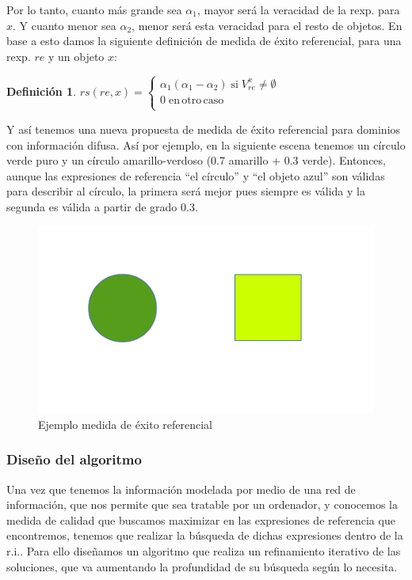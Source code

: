 \documentclass[10pt,a4paper]{article}
\newtheorem{definicion}{Definición}
\begin{document}
Por lo tanto, cuanto más grande sea $\alpha_1$, mayor será la veracidad de la rexp. para $x$. Y cuanto menor sea $\alpha_2$, menor será esta veracidad para el resto de objetos. En base a esto damos la siguiente definición de medida de éxito referencial, para una rexp. $re$ y un objeto $x$:

\begin{definicion}
\label{def: medida}
$rs(re, x) = \left\lbrace 
\begin{array}{ll}
      \alpha_1(\alpha_1 - \alpha_2) \; \mathrm{si} \; V_{re}^x \neq \emptyset\\      
      0 \; \mathrm{en \, otro \, caso}\\
\end{array} \right.$
\end{definicion}

Y así tenemos una nueva propuesta de medida de éxito referencial para dominios con información difusa. Así por ejemplo, en la siguiente escena tenemos un círculo verde puro y un círculo amarillo-verdoso (0.7 amarillo + 0.3 verde). Entonces, aunque las expresiones de referencia ``el círculo'' y ``el objeto azul'' son válidas para describir al círculo, la primera será mejor pues siempre es válida y la segunda es válida a partir de grado 0.3.

\begin{figure}[H]
\centering
\includegraphics[scale=0.3]{img/ejemploMedidaBondad.png}
\caption{Ejemplo medida de éxito referencial}
\end{figure}

\subsubsection{Diseño del algoritmo}

Una vez que tenemos la información modelada por medio de una red de información, que nos permite que sea tratable por un ordenador, y conocemos la medida de calidad que buscamos maximizar en las expresiones de referencia que encontremos, tenemos que realizar la búsqueda de dichas expresiones dentro de la r.i.. Para ello diseñamos un algoritmo que realiza un refinamiento iterativo de las soluciones, que va aumentando la profundidad de su búsqueda según lo necesita.\\
\end{document}
